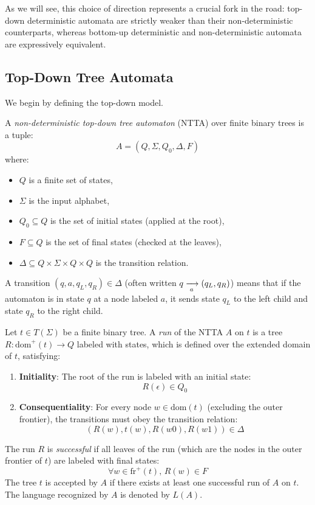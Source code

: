 As we will see, this choice of direction represents a crucial fork in the road: top-down deterministic automata are strictly weaker than their non-deterministic counterparts, whereas bottom-up deterministic and non-deterministic automata are expressively equivalent.

\subsection{Top-Down Tree Automata}
We begin by defining the top-down model.

\begin{definition}
A \emph{non-deterministic top-down tree automaton} (NTTA) over finite binary trees is a tuple:
$$A = (Q, \Sigma, Q_0, \Delta, F)$$
where:
\begin{itemize}
    \item $Q$ is a finite set of states,
    \item $\Sigma$ is the input alphabet,
    \item $Q_0 \subseteq Q$ is the set of initial states (applied at the root),
    \item $F \subseteq Q$ is the set of final states (checked at the leaves),
    \item $\Delta \subseteq Q \times \Sigma \times Q \times Q$ is the transition relation.
\end{itemize}
A transition $(q, a, q_L, q_R) \in \Delta$ (often written $q \xrightarrow[{\;a\;}]{} (q_L, q_R)$) means that if the automaton is in state $q$ at a node labeled $a$, it sends state $q_L$ to the left child and state $q_R$ to the right child.
\end{definition}

\begin{definition}
Let $t \in T(\Sigma)$ be a finite binary tree. A \emph{run} of the NTTA $A$ on $t$ is a tree $R: \text{dom}^+(t) \to Q$ labeled with states, which is defined over the extended domain of $t$, satisfying:
\begin{enumerate}
    \item \textbf{Initiality}: The root of the run is labeled with an initial state:
    $$R(\epsilon) \in Q_0$$
    \item \textbf{Consequentiality}: For every node $w \in \text{dom}(t)$ (excluding the outer frontier), the transitions must obey the transition relation:
    $$(R(w), t(w), R(w0), R(w1)) \in \Delta$$
\end{enumerate}
The run $R$ is \emph{successful} if all leaves of the run (which are the nodes in the outer frontier of $t$) are labeled with final states:
$$\forall w \in \text{fr}^+(t), \, R(w) \in F$$
The tree $t$ is accepted by $A$ if there exists at least one successful run of $A$ on $t$. The language recognized by $A$ is denoted by $L(A)$.
\end{definition}

